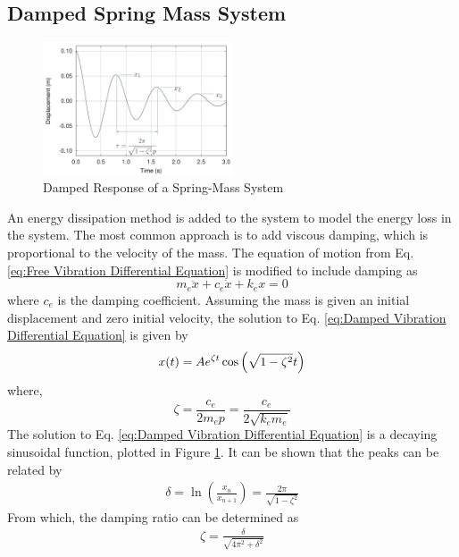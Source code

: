 \subsection{Damped Spring Mass System}
\begin{figure}[h]
    \centering
    \includegraphics[width=0.5\textwidth]{Sections/Figures/damped response.png}
    \caption{Damped Response of a Spring-Mass System}
    \label{fig:Damped Response}
\end{figure}
An energy dissipation method is added to the system to model the energy loss in the system. The most common approach is to add viscous damping, which is proportional to the velocity of the mass. The equation of motion from Eq. \ref{eq:Free Vibration Differential Equation} is modified to include damping as
\begin{equation}
    m_e\ddot{x} + c_e\dot{x} + k_ex = 0 \label{eq:Damped Vibration Differential Equation}
\end{equation}
where $c_e$ is the damping coefficient. Assuming the mass is given an initial displacement and zero initial velocity, the solution to Eq. \ref{eq:Damped Vibration Differential Equation} is given by
\begin{equation}
    x(t) = A e^{\- \zeta t}\cos\left(\sqrt{1 - \zeta^2}t \right) \label{eq:Damped Vibration Solution}
\end{equation}
where, 
\begin{equation}
    \zeta = \frac{c_e}{2m_e p} = \frac{c_e}{2\sqrt{k_e m_e}} \label{eq:Damping Ratio}
\end{equation}
The solution to Eq. \ref{eq:Damped Vibration Differential Equation} is a decaying sinusoidal function, plotted in Figure \ref{fig:Damped Response}. It can be shown that the peaks can be related by
\begin{align}
    \delta = \ln \left(\frac{x_{n}}{x_{n+1}}\right) = \frac{2\pi}{\sqrt{1 - \zeta^2}} \label{eq:Decay Ratio Delta} 
\end{align}
From which, the damping ratio can be determined as 
\begin{align}
    \zeta = \frac{\delta}{\sqrt{4\pi^2 + \delta^2}} \label{eq:Damping Ratio Calculated With Delta}
\end{align}


